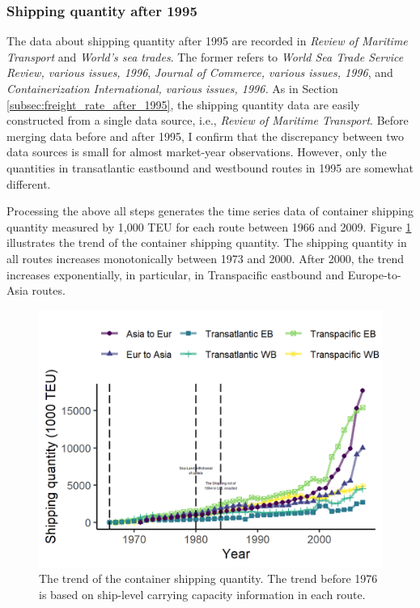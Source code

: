 \subsubsection{Shipping quantity after 1995}
The data about shipping quantity after 1995 are recorded in \textit{Review of Maritime Transport} and \textit{World's sea trades}. The former refers to \textit{World Sea Trade Service Review, various issues, 1996}, \textit{Journal of Commerce, various issues, 1996}, and \textit{Containerization International, various issues, 1996.} As in Section \ref{subsec:freight_rate_after_1995}, the shipping quantity data are easily constructed from a single data source, i.e., \textit{Review of Maritime Transport}. Before merging data before and after 1995, I confirm that the discrepancy between two data sources is small for almost market-year observations. However, only the quantities in transatlantic eastbound and westbound routes in 1995 are somewhat different.

Processing the above all steps generates the time series data of container shipping quantity measured by 1,000 TEU for each route between 1966 and 2009. Figure \ref{fg:container_shipping_quantity_each_route} illustrates the trend of the container shipping quantity. The shipping quantity in all routes increases monotonically between 1973 and 2000. After 2000, the trend increases exponentially, in particular, in Transpacific eastbound and Europe-to-Asia routes.

\begin{figure}[!ht]
\begin{center}
\includegraphics[height = 0.5\textheight]{figuretable/container_shipping_quantity_each_route.png}

\end{center}
\caption{The trend of the container shipping quantity. The trend before 1976 is based on ship-level carrying capacity information in each route.}
\label{fg:container_shipping_quantity_each_route}
\end{figure}


